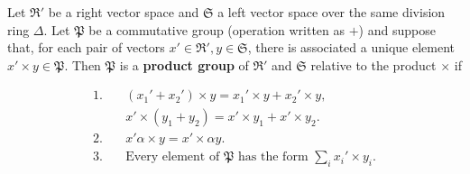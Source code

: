 Let $\mathfrak{R}'$ be a right vector space and $\mathfrak{S}$ a left vector space over the same division ring $\Delta$. Let $\mathfrak{P}$ be a commutative group (operation written as $+$) and suppose that, for each pair of vectors $x' \in \mathfrak{R}', y \in \mathfrak{S}$, there is associated a unique element $x' \times y \in \mathfrak{P}$. Then $\mathfrak{P}$ is a \textbf{product group} of $\mathfrak{R}'$ and $\mathfrak{S}$ relative to the product $\times$ if

$$
\begin{aligned}
\text{1.}&\quad (x_1' + x_2') \times y = x_1' \times y + x_2' \times y,\\
&\quad x' \times (y_1 + y_2) = x' \times y_1 + x' \times y_2.\\[4pt]
\text{2.}&\quad x' \alpha \times y = x' \times \alpha y.\\[4pt]
\text{3.}&\quad \text{Every element of } \mathfrak{P} \text{ has the form } \sum_i x_i' \times y_i.
\end{aligned}
$$
